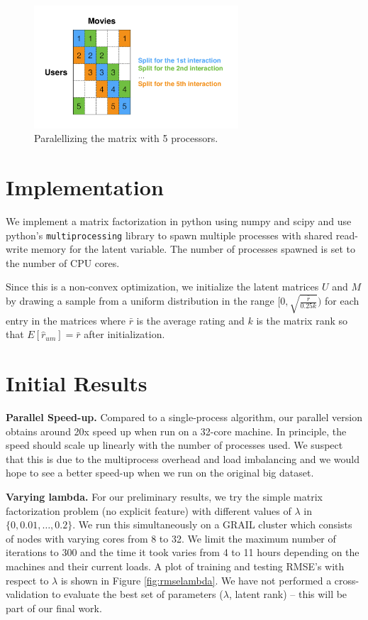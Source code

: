 \documentclass{article} %
\begin{document}
\begin{figure}[h]
\centering
\includegraphics[width=3in]{figures/split.pdf}
\caption{\label{fig:split} Paralellizing the matrix with 5 processors.}
\end{figure}

\section{Implementation}

We implement a matrix factorization in python using numpy and scipy and use python's \texttt{multiprocessing} library to spawn multiple processes with shared read-write memory for the latent variable. The number of processes spawned is set to the number of CPU cores.

Since this is a non-convex optimization, we initialize the latent matrices $U$ and $M$ by drawing a sample from a uniform distribution in the range $[0,\sqrt{\frac{\bar{r}}{0.25k}})$ for each entry in the matrices where $\bar{r}$ is the average rating and $k$ is the matrix rank so that $E[\hat{r}_{um}] = \bar{r}$ after initialization.

\section{Initial Results}

\textbf{Parallel Speed-up.}  Compared to a single-process algorithm, our
parallel version obtains around 20x speed up when run on a 32-core machine. In
principle, the speed should scale up linearly with the number of processes
used. We suspect that this is due to the multiprocess overhead and load
imbalancing and we would hope to see a better speed-up when we run on the
original big dataset.

\textbf{Varying lambda.}  For our preliminary results, we try the simple
matrix factorization problem (no explicit feature) with different
values of $\lambda$ in $\{0, 0.01, \ldots, 0.2\}$. We run this simultaneously
on a GRAIL cluster which consists of nodes with varying cores from 8 to 32. We
limit the maximum number of iterations to 300 and the time it took varies from
4 to 11 hours depending on the machines and their current loads. A plot of
training and testing RMSE's with respect to $\lambda$ is shown in Figure
\ref{fig:rmselambda}. We have not performed a cross-validation to evaluate the
best set of parameters ($\lambda$, latent rank) -- this will be part of our
final work.
\end{document}
